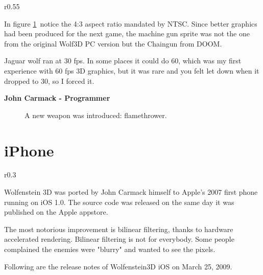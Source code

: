 \documentclass[book.tex]{subfiles}
\begin{document}
\par
\begin{figure}[H]
\centering
\end{figure}
\par
\begin{figure}[H]
\centering
 \caption{}
 \label{gatling}
\end{figure}
\par



\begin{wrapfigure}[8]{r}{0.55\textwidth}
\vspace{-10pt}
\end{wrapfigure}
In figure \ref{gatling}\, notice the 4:3 aspect ratio mandated by NTSC. Since better graphics had been produced for the next game, the machine gun sprite was not the one from the original Wolf3D PC version but the Chaingun from DOOM.\\
\par
\vspace{5pt}
\begin{fancyquotes}
Jaguar wolf ran at 30 fps.  In some places it could do 60, which was my first experience with 60 fps 3D graphics, but it was rare and you felt let down when it dropped to 30, so I forced it.\\
\par
\textbf{John Carmack - Programmer}
 \end{fancyquotes}
\par


\begin{figure}[H]
\centering
 \caption{A new weapon was introduced: flamethrower.}
\end{figure}




\section{iPhone}
\begin{wrapfigure}[12]{r}{0.3\textwidth}
\vspace{-10pt}
\end{wrapfigure}
Wolfenstein 3D was ported by John Carmack himself to Apple's 2007 first phone running on iOS 1.0. The source code was released on the same day it was published on the Apple appstore.\\
\par
The most notorious improvement is bilinear filtering, thanks to hardware accelerated rendering. Bilinear filtering is not for everybody. Some people complained the enemies were "blurry" and wanted to see the pixels.\\
\par
 Following are the release notes of Wolfenstein3D iOS on March 25, 2009.
\end{document}
